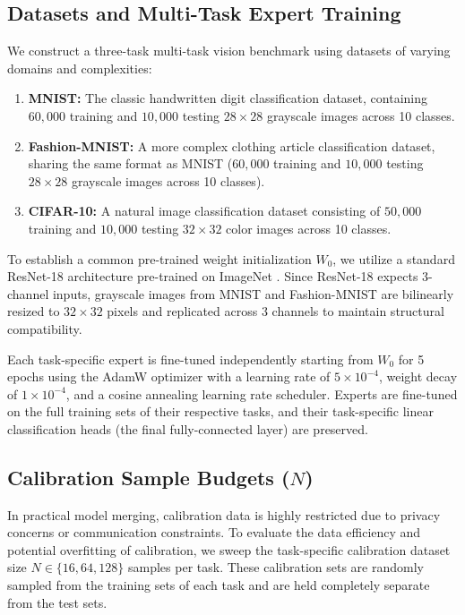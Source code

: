 \documentclass{article}
\begin{document}
\subsection{Datasets and Multi-Task Expert Training}
We construct a three-task multi-task vision benchmark using datasets of varying domains and complexities:
\begin{enumerate}
    \item \textbf{MNIST:} The classic handwritten digit classification dataset, containing $60,000$ training and $10,000$ testing $28 \times 28$ grayscale images across 10 classes.
    \item \textbf{Fashion-MNIST:} A more complex clothing article classification dataset, sharing the same format as MNIST ($60,000$ training and $10,000$ testing $28 \times 28$ grayscale images across 10 classes).
    \item \textbf{CIFAR-10:} A natural image classification dataset consisting of $50,000$ training and $10,000$ testing $32 \times 32$ color images across 10 classes.
\end{enumerate}
To establish a common pre-trained weight initialization $W_0$, we utilize a standard ResNet-18 architecture \cite{he2016deep} pre-trained on ImageNet \cite{deng2009imagenet}. Since ResNet-18 expects 3-channel inputs, grayscale images from MNIST and Fashion-MNIST are bilinearly resized to $32 \times 32$ pixels and replicated across 3 channels to maintain structural compatibility. 

Each task-specific expert is fine-tuned independently starting from $W_0$ for 5 epochs using the AdamW optimizer \cite{loshchilov2017decoupled} with a learning rate of $5 \times 10^{-4}$, weight decay of $1 \times 10^{-4}$, and a cosine annealing learning rate scheduler. Experts are fine-tuned on the full training sets of their respective tasks, and their task-specific linear classification heads (the final fully-connected layer) are preserved.

\subsection{Calibration Sample Budgets ($N$)}
In practical model merging, calibration data is highly restricted due to privacy concerns or communication constraints. To evaluate the data efficiency and potential overfitting of calibration, we sweep the task-specific calibration dataset size $N \in \{16, 64, 128\}$ samples per task. These calibration sets are randomly sampled from the training sets of each task and are held completely separate from the test sets.
\end{document}

